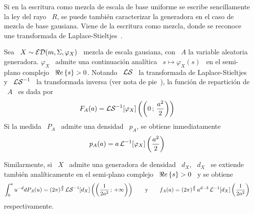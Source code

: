 Si  en  la  escritura  como  mezcla  de  escala  de  base  uniforme  se  escribe
sencillamente  la  ley  del rayo  \  $R$,  se  puede tambi\'en  caracterizar  la
generadora en  el caso de  mezcla de base  gausiana. Viene de la  escritura como
mezcla,       donde       se       reconoce      une       transformada       de
Laplace-Stieltjes~.

\begin{lema}\label{Lem:MP:PaLaplaceInversa}
  Sea \ $X \sim \mathcal{ED}(m,\Sigma,\varphi_X)$ \  mezcla de escala gausiana, con \ $A$
  la  variable aleatoria  generadora.  $\varphi_X$ \  admite una  continuaci\'on
  anal\'itica \ $s \mapsto \varphi_X(s)$ \ en el semi-plano complejo \ $\Re e \left\{ s \right\}
  > 0$.  Notando \ $\mathcal{LS}$ \ la transformada de Laplace-Stieltjes y \ $\mathcal{LS}^{-1}$ \
  la transformada inversa  (ver nota de pie~),
  la funci\'on de repartici\'on de \ $A$ \ es dada por
  \[
  F_A(a) = \mathcal{LS}^{-1}[\varphi_X] \left( \left( 0 \, ; \, \frac{a^2}{2} \right) \right)
  \]
  Si la medida \ $P_A$ \ admite una densidad \ $p_A$, se obtiene inmediatamente
  \[
  p_A(a) = a \, \mathcal{L}^{-1}[\varphi_X] \left(\frac{a^2}{2} \right)
  \]

  Similarmente, si \ $X$ \ admite una  generadora de densidad \ $d_X$, \ $d_X$ \
  se extiende tambi\'en anal\'iticamente en el semi-plano complejo \ $\Re e \left\{ s \right\} >
  0$ \ y se obtiene
  \[
  \int_0^a u^{-d} dP_A(u) = (2 \pi)^{\frac{d}{2}} \, \mathcal{LS}^{-1}[d_X] \left( \left(
      \frac{1}{2 a^2} \, ; \, +\infty \right) \right) \qquad \mbox{y} \qquad f_A(a) =
  (2 \pi)^{\frac{d}{2}} \, a^{d-3} \, \mathcal{L}^{-1}[d_X]\left( \frac{1}{2 a^2} \right)
  \]
  respectivamente.
\end{lema}
%
